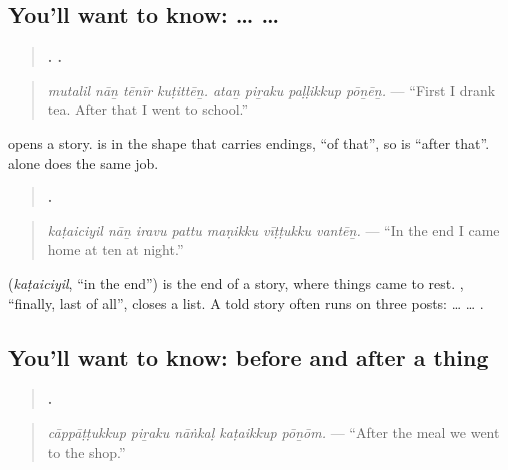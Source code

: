 \subsection*{You'll want to know:  …   … }
\begin{quote}
\textbf{   .    .}
\end{quote}

\begin{quote}
\emph{mutalil nāṉ tēnīr kuṭittēṉ. ataṉ piṟaku paḷḷikkup pōṉēṉ.} — \textquotedblleft{}First I drank tea. After that I went to school.\textquotedblright{}
\end{quote}

\textbf{} opens a story. \textbf{} is \textbf{} in the shape that carries endings, \textquotedblleft{}of that\textquotedblright{}, so \textbf{ } is \textquotedblleft{}after that\textquotedblright{}. \textbf{} alone does the same job.

\begin{quote}
\textbf{      .}
\end{quote}

\begin{quote}
\emph{kaṭaiciyil nāṉ iravu pattu maṇikku vīṭṭukku vantēṉ.} — \textquotedblleft{}In the end I came home at ten at night.\textquotedblright{}
\end{quote}

\textbf{} (\emph{kaṭaiciyil}, \textquotedblleft{}in the end\textquotedblright{}) is the end of a story, where things came to rest. \textbf{}, \textquotedblleft{}finally, last of all\textquotedblright{}, closes a list. A told story often runs on three posts: \textbf{} … \textbf{ } … \textbf{}.

\subsection*{You'll want to know: before and after a thing}
\begin{quote}
\textbf{    .}
\end{quote}

\begin{quote}
\emph{cāppāṭṭukkup piṟaku nāṅkaḷ kaṭaikkup pōṉōm.} — \textquotedblleft{}After the meal we went to the shop.\textquotedblright{}
\end{quote}

